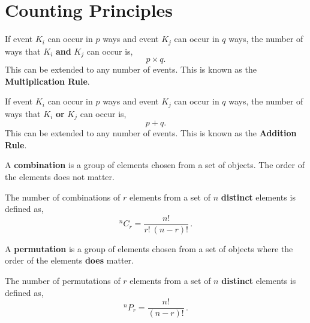 \section{Counting Principles}\label{mod2:section:CountingPrinciples}

\begin{defn}\label{mod2:defn:MultiplicationRule}
	If event $K_i$ can occur in $p$ ways and event $K_j$ can occur in $q$ ways, the number of ways that $K_i$ \textbf{and} $K_j$ can occur is,
	\begin{equation}
		p \times q.
	\end{equation}
	This can be extended to any number of events. This is known as the \textbf{Multiplication Rule}.
\end{defn}


\begin{defn}\label{mod2:defn:AdditionRule}
	If event $K_i$ can occur in $p$ ways and event $K_j$ can occur in $q$ ways, the number of ways that $K_i$ \textbf{or} $K_j$ can occur is,
	\begin{equation}
		p + q.
	\end{equation}
	This can be extended to any number of events. This is known as the \textbf{Addition Rule}.
\end{defn}


\begin{defn} \label{mod2:defn:Combination}
	A \textbf{combination} is a group of elements chosen from a set of objects. The order of the elements does not matter.
\end{defn}


\begin{defn} \label{mod2:defn:CombinationEqn}
	The number of combinations of $r$ elements from a set of $n$ \textbf{distinct} elements is defined as,
	\begin{equation}
		^nC_r = \frac{n!}{r!~(n-r)!} \,.
	\end{equation}
\end{defn}


\begin{defn}\label{mod2:defn:Permutation}
	A \textbf{permutation} is a group of elements chosen from a set of objects where the order of the elements \textbf{does} matter.	
\end{defn}


\begin{defn}\label{mod2:defn:PermutationEqn}
	The number of permutations of $r$ elements from a set of $n$ \textbf{distinct} elements is defined as,
	\begin{equation}
		^nP_r = \frac{n!}{(n-r)!} \,.
	\end{equation}
\end{defn}


